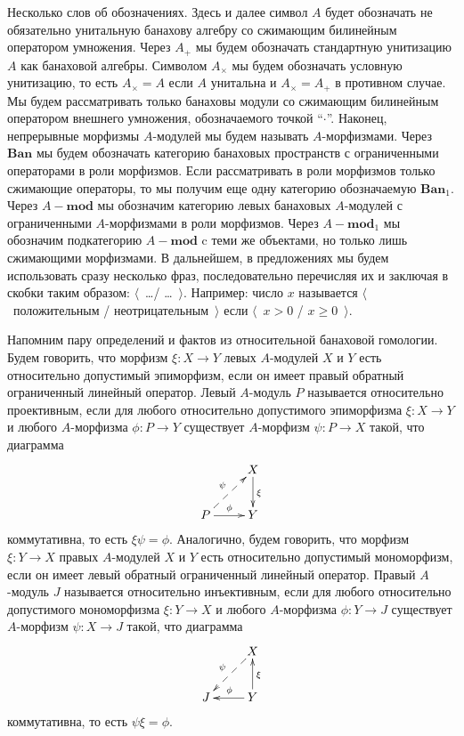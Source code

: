\documentclass[12pt]{article}
\begin{document}
Несколько слов об обозначениях. Здесь и далее символ $A$ будет обозначать не
обязательно унитальную банахову алгебру со сжимающим билинейным оператором
умножения. Через $A_+$ мы будем обозначать стандартную унитизацию $A$ как
банаховой алгебры. Символом $A_\times$ мы будем обозначать условную унитизацию,
то есть $A_\times=A$ если $A$ унитальна и $A_\times=A_+$ в противном случае. Мы
будем рассматривать только банаховы модули со сжимающим билинейным оператором
внешнего умножения, обозначаемого точкой ``$\cdot$''. Наконец, непрерывные
морфизмы $A$-модулей мы будем называть $A$-морфизмами. Через $\mathbf{Ban}$ мы
будем обозначать категорию банаховых пространств с ограниченными операторами в
роли морфизмов. Если рассматривать в роли морфизмов только сжимающие операторы,
то мы получим еще одну категорию обозначаемую $\mathbf{Ban}_1$. Через
$A-\mathbf{mod}$ мы обозначим категорию левых банаховых $A$-модулей с
ограниченными $A$-морфизмами в роли морфизмов. Через $A-\mathbf{mod}_1$ мы
обозначим подкатегорию $A-\mathbf{mod}$ c теми же объектами, но только лишь
сжимающими морфизмами. В дальнейшем, в предложениях мы будем использовать сразу
несколько фраз, последовательно перечисляя их и заключая в скобки таким образом:
$\langle$~\ldots / \ldots~$\rangle$. Например: число $x$ называется
$\langle$~положительным / неотрицательным~$\rangle$ если $\langle$~$x>0$ /
$x\geq 0$~$\rangle$.

Напомним пару определений и фактов из относительной банаховой гомологии. Будем
говорить, что морфизм $\xi:X\to Y$ левых $A$-модулей $X$ и $Y$ есть относительно
допустимый эпиморфизм, если он имеет правый обратный ограниченный линейный
оператор. Левый $A$-модуль $P$ называется относительно проективным, если для
любого относительно допустимого эпиморфизма $\xi:X\to Y$ и любого $A$-морфизма
$\phi:P\to Y$ существует $A$-морфизм $\psi:P\to X$ такой, что диаграмма
$$
    \xymatrix{
    & {X} \ar@{->}[d]^{\xi}\\  %
    {P} \ar@{-->}[ur]^{\psi} \ar[r]^{\phi} &{Y}}  %
$$
коммутативна, то есть $\xi\psi=\phi$. Аналогично, будем говорить, что морфизм
$\xi:Y\to X$ правых $A$-модулей $X$ и $Y$ есть относительно допустимый
мономорфизм, если он имеет левый обратный ограниченный линейный оператор. Правый
$A$-модуль $J$ называется относительно инъективным, если для любого относительно
допустимого мономорфизма $\xi:Y\to X$ и любого $A$-морфизма $\phi:Y\to J$
существует $A$-морфизм $\psi:X\to J$ такой, что диаграмма
$$
    \xymatrix{
        & {X} \ar@{-->}[dl]_{\psi} \\%
            {J} &{Y} \ar[l]_{\phi} \ar@{->}[u]_{\xi}}  %
$$
коммутативна, то есть $\psi\xi=\phi$.
\end{document}
